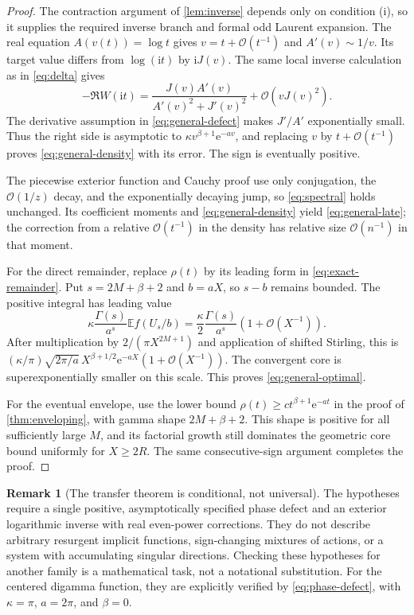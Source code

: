 \documentclass[11pt,a4paper]{article}
\theoremstyle{definition}
\newtheorem{remark}[theorem]{Remark}
\numberwithin{equation}{section}
\newcommand{\ii}{\mathrm{i}}
\newcommand{\ee}{\mathrm{e}}
\newcommand{\Oh}{\mathcal O}
\newcommand{\E}{\mathbb E}
\begin{document}
\begin{proof}
The contraction argument of \cref{lem:inverse} depends only on condition (i), so it supplies the required inverse branch and formal odd Laurent expansion. The real equation $A(v(t))=\log t$ gives $v=t+\Oh(t^{-1})$ and $A'(v)\sim1/v$. Its target value differs from $\log(\ii t)$ by $\ii J(v)$. The same local inverse calculation as in \eqref{eq:delta} gives
\[
 -\Re W(\ii t)
 =\frac{J(v)A'(v)}{A'(v)^2+J'(v)^2}+\Oh(vJ(v)^2).
\]
The derivative assumption in \eqref{eq:general-defect} makes $J'/A'$ exponentially small. Thus the right side is asymptotic to
$\kappa v^{\beta+1}\ee^{-av}$, and replacing $v$ by $t+\Oh(t^{-1})$ proves \eqref{eq:general-density} with its error. The sign is eventually positive.

The piecewise exterior function and Cauchy proof use only conjugation, the $\Oh(1/z)$ decay, and the exponentially decaying jump, so \eqref{eq:spectral} holds unchanged. Its coefficient moments and \eqref{eq:general-density} yield \eqref{eq:general-late}; the correction from a relative $\Oh(t^{-1})$ in the density has relative size $\Oh(n^{-1})$ in that moment.

For the direct remainder, replace $\rho(t)$ by its leading form in \eqref{eq:exact-remainder}. Put $s=2M+\beta+2$ and $b=aX$, so $s-b$ remains bounded. The positive integral has leading value
\[
 \kappa\frac{\Gamma(s)}{a^s}\E f(U_s/b)
 =\frac\kappa2\frac{\Gamma(s)}{a^s}(1+\Oh(X^{-1})).
\]
After multiplication by $2/(\pi X^{2M+1})$ and application of shifted Stirling, this is
$(\kappa/\pi)\sqrt{2\pi/a}\,X^{\beta+1/2}\ee^{-aX}
(1+\Oh(X^{-1}))$. The convergent core is superexponentially smaller on this scale. This proves \eqref{eq:general-optimal}.

For the eventual envelope, use the lower bound
$\rho(t)\ge c t^{\beta+1}\ee^{-at}$ in the proof of \cref{thm:enveloping}, with gamma shape $2M+\beta+2$. This shape is positive for all sufficiently large $M$, and its factorial growth still dominates the geometric core bound uniformly for $X\ge2R$. The same consecutive-sign argument completes the proof.
\end{proof}

\begin{remark}[The transfer theorem is conditional, not universal]
The hypotheses require a single positive, asymptotically specified phase defect and an exterior logarithmic inverse with real even-power corrections. They do not describe arbitrary resurgent implicit functions, sign-changing mixtures of actions, or a system with accumulating singular directions. Checking these hypotheses for another family is a mathematical task, not a notational substitution. For the centered digamma function, they are explicitly verified by \eqref{eq:phase-defect}, with $\kappa=\pi$, $a=2\pi$, and $\beta=0$.
\end{remark}
\end{document}
